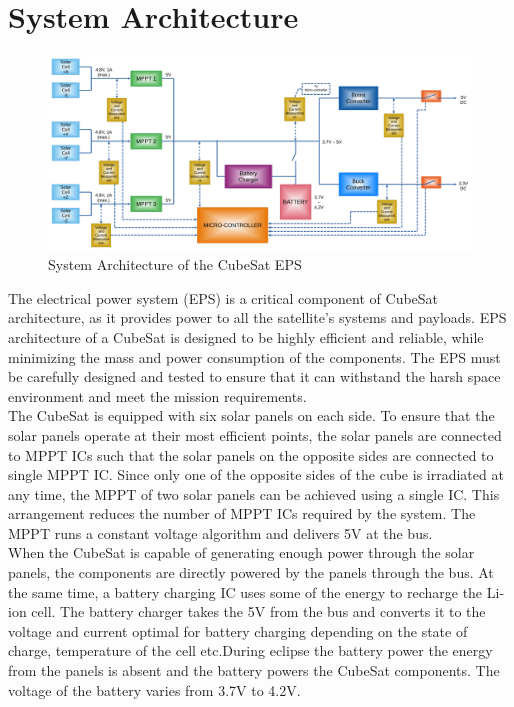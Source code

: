 \chapter{System Architecture}

\begin{figure}[h]
	\centering
	\includegraphics[width=\columnwidth]{IMGS/diag1.pdf}
	\caption{System Architecture of the CubeSat EPS}
	\label{fig:arch}
\end{figure} 
The electrical power system (EPS) is a critical component of CubeSat architecture, as it provides power to all the satellite's systems and payloads. EPS architecture of a CubeSat is designed to be highly efficient and reliable, while minimizing the mass and power consumption of the components. The EPS must be carefully designed and tested to ensure that it can withstand the harsh space environment and meet the mission requirements.\\


The CubeSat is equipped with six solar panels on each side. To ensure that the solar panels operate at their most efficient points, the solar panels are connected to MPPT ICs such that the solar panels on the opposite sides are connected to single MPPT IC. Since only one of the opposite sides of the cube is irradiated at any time, the MPPT of two solar panels can be achieved using a single IC. This arrangement reduces the number of MPPT ICs required by the system. The MPPT runs a constant voltage algorithm and delivers 5V at the bus. 
\\

When the CubeSat is capable of generating enough power through the solar panels, the components are directly powered by the panels through the bus. At the same time, a battery charging IC uses some of the energy to recharge the Li-ion cell. The battery charger takes the 5V from the bus and converts it to the voltage and current optimal for battery charging depending on the state of charge, temperature of the cell etc.During eclipse the battery power the energy from the panels is absent and the battery powers the CubeSat components. The voltage of the battery varies from 3.7V to 4.2V.
\\

